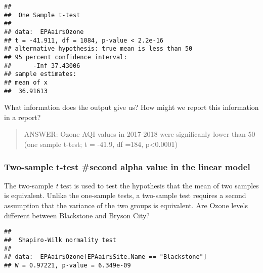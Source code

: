 \documentclass[]{article}
\newenvironment{Shaded}{\begin{snugshade}}{\end{snugshade}}
\newcommand{\KeywordTok}[1]{\textcolor[rgb]{0.13,0.29,0.53}{\textbf{#1}}}
\newcommand{\StringTok}[1]{\textcolor[rgb]{0.31,0.60,0.02}{#1}}
\newcommand{\OperatorTok}[1]{\textcolor[rgb]{0.81,0.36,0.00}{\textbf{#1}}}
\newcommand{\NormalTok}[1]{#1}
\begin{document}
\begin{verbatim}
## 
##  One Sample t-test
## 
## data:  EPAair$Ozone
## t = -41.911, df = 1084, p-value < 2.2e-16
## alternative hypothesis: true mean is less than 50
## 95 percent confidence interval:
##      -Inf 37.43006
## sample estimates:
## mean of x 
##  36.91613
\end{verbatim}

What information does the output give us? How might we report this
information in a report?

\begin{quote}
ANSWER: Ozone AQI values in 2017-2018 were significanly lower than 50
(one sample t-test; t = -41.9, df =184, p\textless{}0.0001)
\end{quote}

\subsubsection{Two-sample t-test \#second alpha value in the linear
model}\label{two-sample-t-test-second-alpha-value-in-the-linear-model}

The two-sample \emph{t} test is used to test the hypothesis that the
mean of two samples is equivalent. Unlike the one-sample tests, a
two-sample test requires a second assumption that the variance of the
two groups is equivalent. Are Ozone levels different between Blackstone
and Bryson City?

\begin{Shaded}
\end{Shaded}

\begin{verbatim}
## 
##  Shapiro-Wilk normality test
## 
## data:  EPAair$Ozone[EPAair$Site.Name == "Blackstone"]
## W = 0.97221, p-value = 6.349e-09
\end{verbatim}

\begin{Shaded}
\end{Shaded}
\end{document}
